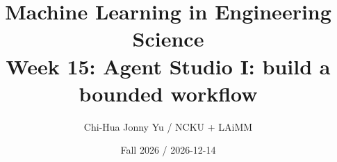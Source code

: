 \documentclass[11pt,oneside]{book}
\begin{document}
\title{Machine Learning in Engineering Science\\\large Week 15: Agent Studio I: build a bounded workflow}\author{Chi-Hua Jonny Yu / NCKU + LAiMM}\date{Fall 2026 / 2026-12-14}\maketitle

\end{document}
